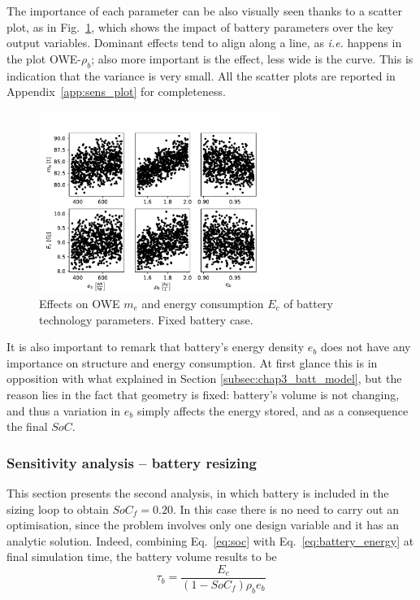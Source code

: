 The importance of each parameter can be also visually seen thanks to a scatter plot, as in Fig.~\ref{fig:sens_an_battery_example}, which shows the impact of battery parameters over the key output variables.
Dominant effects tend to align along a line, as \textit{i.e.} happens in the plot OWE-$\rho_b$; also more important is the effect, less wide is the curve. 
This is indication that the variance is very small. 
All the scatter plots are reported in Appendix~\ref{app:sens_plot} for completeness.
\begin{figure}[h!]
	\centering
	\includegraphics[keepaspectratio, width=0.7\textwidth]{images/chap3/techno_sensitivity_battery}
	\caption{Effects on OWE $m_e$ and energy consumption $E_c$ of battery technology parameters. Fixed battery case.}
	\label{fig:sens_an_battery_example}
\end{figure}

It is also important to remark that battery's energy density $e_{b}$ does not have any importance on structure and energy consumption. 
At first glance this is in opposition with what explained in Section \ref{subsec:chap3_batt_model}, but the reason lies in the fact that geometry is fixed: battery's volume is not changing, and thus a variation in $e_b$ simply affects the energy stored, and as a consequence the final $SoC$. 

\subsubsection{Sensitivity analysis -- battery resizing}
\label{subsubsec:chap3_sens_batt_res}

This section presents the second analysis, in which battery is included in the sizing loop to obtain $SoC_f=0.20$. 
In this case there is no need to carry out an optimisation, since the problem involves only one design variable and it has an analytic solution. 
Indeed, combining Eq.~\eqref{eq:soc} with Eq.~\eqref{eq:battery_energy} at final simulation time, the battery volume results to be
\begin{equation}
\label{eq:battery_volume_soc}
\tau_{b} = \frac{E_c}{(1-SoC_f)\rho_{b}e_{b}}
\end{equation}

